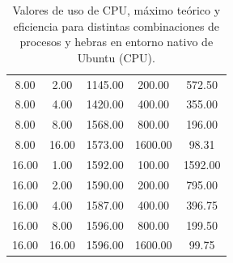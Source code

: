 \begin{table}[ht]
\begin{tabular}{|c|c|c|c|c|}
        8.00              & 2.00            & 1145.00           & 200.00            & 572.50              \\
        8.00              & 4.00            & 1420.00           & 400.00            & 355.00              \\
        8.00              & 8.00            & 1568.00           & 800.00            & 196.00              \\
        8.00              & 16.00           & 1573.00           & 1600.00           & 98.31               \\
        16.00             & 1.00            & 1592.00           & 100.00            & 1592.00             \\
        16.00             & 2.00            & 1590.00           & 200.00            & 795.00              \\
        16.00             & 4.00            & 1587.00           & 400.00            & 396.75              \\
        16.00             & 8.00            & 1596.00           & 800.00            & 199.50              \\
        16.00             & 16.00           & 1596.00           & 1600.00           & 99.75               \\
        \hline
    \end{tabular}
    \caption{Valores de uso de CPU, máximo teórico y eficiencia para distintas combinaciones de procesos y hebras en entorno nativo de Ubuntu (CPU).}
    \label{tab:thread_sweep_ubuntu_cpu_native_cpu}
\end{table}

